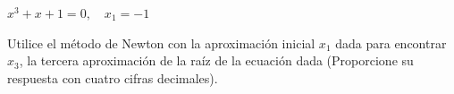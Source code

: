 \item $x^3 + x + 1 = 0, \quad x_1 = -1$
\par
Utilice el método de Newton con la aproximación inicial $x_1$ dada para encontrar $x_3$, la tercera aproximación de la raíz de la ecuación dada (Proporcione su respuesta con cuatro cifras decimales).
